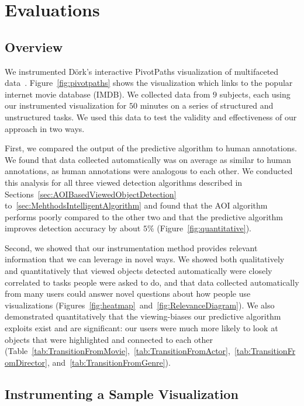 \section{Evaluations}
\label{sec:DOICollectionEvaluation}

\subsection{Overview}
We instrumented D{\"o}rk's interactive PivotPaths visualization of multifaceted data~\cite{Dor12}. Figure~\ref{fig:pivotpaths} shows the visualization which links to the popular internet movie database (IMDB). We collected data from $9$ subjects, each using our instrumented visualization for $50$ minutes on a series of structured and unstructured tasks. We used this data to test the validity and effectiveness of our approach in two ways. 

First, we compared the output of the predictive algorithm to human annotations. We found that data collected automatically was on average as similar to human annotations, as human annotations were analogous to each other. We conducted this analysis for all three viewed detection algorithms described in Sections~\ref{sec:AOIBasedViewedObjectDetection} to~\ref{sec:MehthodsIntelligentAlgorithm} and found that the AOI algorithm performs poorly compared to the other two and that the predictive algorithm improves detection accuracy by about $5\%$  (Figure~\ref{fig:quantitative}). 

Second, we showed that our instrumentation method provides relevant information that we can leverage in novel ways. We showed both qualitatively and quantitatively that viewed objects detected automatically were closely correlated to tasks people were asked to do, and that data collected automatically from many users could answer novel questions about how people use visualizations (Figures~\ref{fig:heatmap}~and~\ref{fig:RelevanceDiagram}).    We also demonstrated quantitatively that the viewing-biases our predictive algorithm exploits exist and are significant: our users were much more likely to look at objects that were highlighted and connected to each other (Table~\ref{tab:TransitionFromMovie},~\ref{tab:TransitionFromActor},~\ref{tab:TransitionFromDirector}, and~\ref{tab:TransitionFromGenre}).


\subsection{Instrumenting a Sample Visualization}
\label{sec:InstrumentingVisualization}

